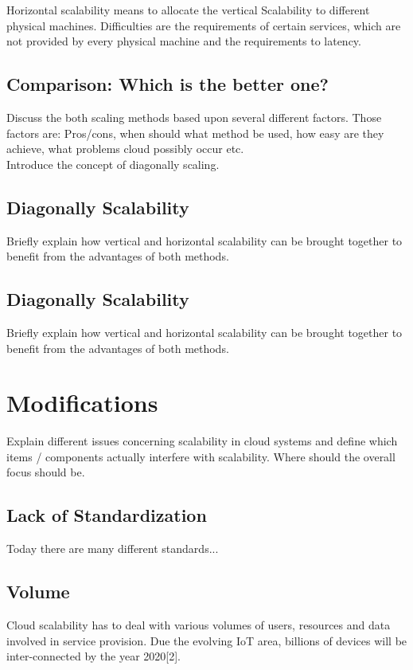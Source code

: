 \documentclass[sigconf]{acmart}
\begin{document}
Horizontal scalability means to allocate the vertical
Scalability to different physical machines. Difficulties are the
requirements of certain services, which are not provided by
every physical machine and the requirements to latency.

\subsection{Comparison: Which is the better one?}

Discuss the both scaling methods based upon several
different factors. Those factors are: Pros/cons, when should
what method be used, how easy are they achieve, what
problems cloud possibly occur etc. \\

Introduce the concept of diagonally scaling.

\subsection{Diagonally Scalability}

Briefly explain how vertical and horizontal scalability can
be brought together to benefit from the advantages of both
methods.

\subsection{Diagonally Scalability}

Briefly explain how vertical and horizontal scalability can
be brought together to benefit from the advantages of both
methods.


\section{Modifications}

Explain different issues concerning scalability in cloud
systems and define which items / components actually
interfere with scalability. Where should the overall focus
should be.

\subsection{Lack of Standardization}
Today there are many different standards...

\subsection{Volume}
Cloud scalability has to deal with various
volumes of users, resources and data involved in service
provision. Due the evolving IoT area, billions of devices will
be inter-connected by the year 2020[2].
\end{document}
